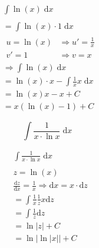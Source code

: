 \begin{uebung}
	\begin{solution}
		\begin{align*}
			 & \int \ln(x) \;\mathrm{d}x                         \\
			\\
			 & = \int \ln(x) \cdot 1 \;\mathrm{d}x               \\
			 & \begin{array}{ll}
				u = \ln(x) & \Rightarrow u' = \frac{1}{x} \\
				v' = 1     & \Rightarrow v = x
			\end{array}                        \\
			 & \Rightarrow\int\ln(x) \;\mathrm{d}x               \\
			 & = \ln(x) \cdot x- \int\frac{1}{x} x \;\mathrm{d}x \\
			 & = \ln(x) x-x+C                                    \\
			 & = x (\ln(x)-1) +C
		\end{align*}
	\end{solution}

	\begin{question}
		\[
			\int \frac{1}{x \cdot \ln x} \;\mathrm{d}x
		\]
	\end{question}

	\begin{solution}
		\begin{align*}
			 & \int \frac{1}{x \cdot \ln x} \;\mathrm{d}x                                                      \\
			\\
			 & z = \ln (x)                                                                                     \\
			 & \frac{\mathrm{d} z}{\mathrm{d} x} = \frac{1}{x} \Rightarrow \mathrm{d} x = x \cdot \mathrm{d} z \\
			 & = \int \frac{1}{x} \frac{1}{z} x \mathrm{d}z                                                    \\
			 & = \int \frac{1}{z} \mathrm{d} z                                                                 \\
			 & = \ln|z| + C                                                                                    \\
			 & = \ln|\ln|x|| + C
		\end{align*}
	\end{solution}
\end{uebung}
